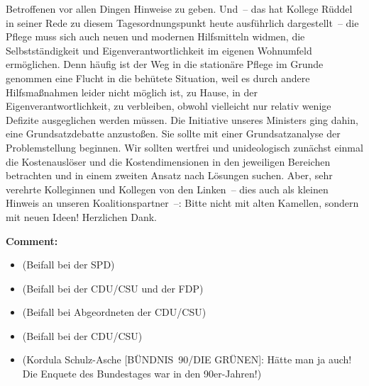\documentclass{article}
\begin{document}
Betroffenen vor allen Dingen Hinweise zu geben. Und – das hat Kollege Rüddel in seiner Rede zu diesem Tagesordnungspunkt heute ausführlich dargestellt – die Pflege muss sich auch neuen und modernen Hilfsmitteln widmen, die Selbstständigkeit und Eigenverantwortlichkeit im eigenen Wohnumfeld ermöglichen. Denn häufig ist der Weg in die stationäre Pflege im Grunde genommen eine Flucht in die behütete Situation, weil es durch andere Hilfsmaßnahmen leider nicht möglich ist, zu Hause, in der Eigenverantwortlichkeit, zu verbleiben, obwohl vielleicht nur relativ wenige Defizite ausgeglichen werden müssen.  Die Initiative unseres Ministers ging dahin, eine Grundsatzdebatte anzustoßen. Sie sollte mit einer Grundsatzanalyse der Problemstellung beginnen. Wir sollten wertfrei und unideologisch zunächst einmal die Kostenauslöser und die Kostendimensionen in den jeweiligen Bereichen betrachten und in einem zweiten Ansatz nach Lösungen suchen. Aber, sehr verehrte Kolleginnen und Kollegen von den Linken – dies auch als kleinen Hinweis an unseren Koalitionspartner –: Bitte nicht mit alten Kamellen, sondern mit neuen Ideen! Herzlichen Dank.  

\noindent\textbf{Comment:}
\begin{itemize}
    \setlength\itemsep{-3pt}
    \item (Beifall bei der SPD)
    \setlength\itemsep{-3pt}
    \item (Beifall bei der CDU/CSU und der FDP)
    \setlength\itemsep{-3pt}
    \item (Beifall bei Abgeordneten der CDU/CSU)
    \setlength\itemsep{-3pt}
    \item (Beifall bei der CDU/CSU)
    \setlength\itemsep{-3pt}
    \item (Kordula Schulz-Asche [BÜNDNIS 90/DIE GRÜNEN]: Hätte man ja auch! Die Enquete des Bundestages war in den 90er-Jahren!)
\end{itemize}
\end{document}
